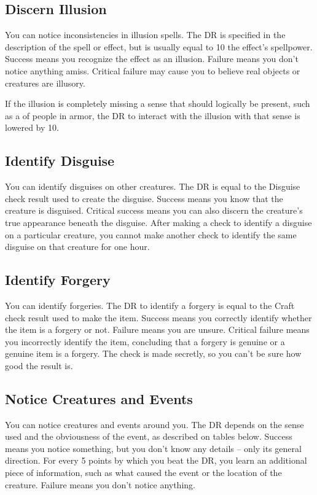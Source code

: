     \subsection{Discern Illusion}
        You can notice inconsistencies in illusion spells. The DR is specified in the description of the spell or effect, but is usually equal to 10 \add the effect's spellpower. Success means you recognize the effect as an illusion. Failure means you don't notice anything amiss. Critical failure may cause you to believe real objects or creatures are illusory.

        If the illusion is completely missing a sense that should logically be present, such as a  of people in armor, the DR to interact with the illusion with that sense is lowered by 10.

    \subsection{Identify Disguise}
        You can identify disguises on other creatures. The DR is equal to the Disguise check result used to create the disguise. Success means you know that the creature is disguised. Critical success means you can also discern the creature's true appearance beneath the disguise. After making a check to identify a disguise on a particular creature, you cannot make another check to identify the same disguise on that creature for one hour.

    \subsection{Identify Forgery}
        You can identify forgeries. The DR to identify a forgery is equal to the Craft check result used to make the item. Success means you correctly identify whether the item is a forgery or not. Failure means you are unsure. Critical failure means you incorrectly identify the item, concluding that a forgery is genuine or a genuine item is a forgery. The check is made secretly, so you can't be sure how good the result is.

    \subsection{Notice Creatures and Events}
        You can notice creatures and events around you. The DR depends on the sense used and the obviousness of the event, as described on tables below. Success means you notice something, but you don't know any details -- only its general direction. For every 5 points by which you beat the DR, you learn an additional piece of information, such as what caused the event or the location of the creature. Failure means you don't notice anything.

